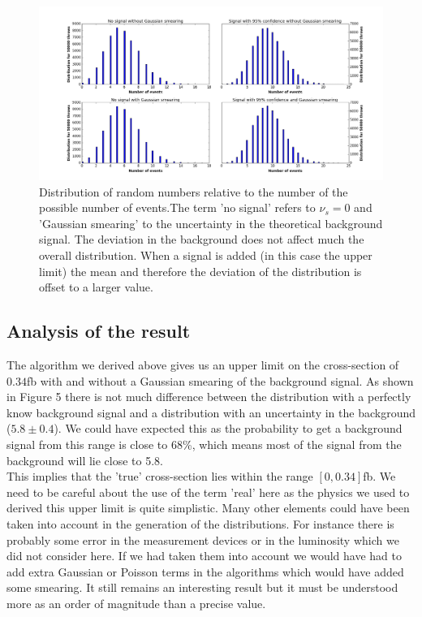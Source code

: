 \documentclass[10 pt]{article}
\numberwithin{equation}{section}
\begin{document}
\begin{figure}[H]
\includegraphics[width=\linewidth]{poisson}
\caption{Distribution of random numbers relative to the number of the possible number of events.The term 'no signal' refers to $\nu_s = 0$ and 'Gaussian smearing' to the uncertainty in the theoretical background signal. The deviation in the background does not affect much the overall distribution. When a signal is added (in this case the upper limit) the mean and therefore the deviation of the distribution is offset to a larger value.}
\end{figure}

\begin{multicols}{2}

\subsection{Analysis of the result}

The algorithm we derived above gives us an upper limit on the cross-section of $0.34$fb with and without a Gaussian smearing of the background signal. As shown in Figure 5 there is not much difference between the distribution with a perfectly know background signal and a distribution with an uncertainty in the background ($5.8 \pm 0.4$). We could have expected this as the probability to get a background signal from this range is close to 68\%, which means most of the signal from the background will lie close to 5.8.\\
This implies that the 'true' cross-section lies within the range $[0,0.34]$fb. We need to be careful about the use of the term 'real' here as the physics we used to derived this upper limit is quite simplistic. Many other elements could have been taken into account in the generation of the distributions. For instance there is probably some error in the measurement devices or in the luminosity which we did not consider here. If we had taken them into account we would have had to add extra Gaussian or Poisson terms in the algorithms which would have added some smearing. It still remains an interesting result but it must be understood more as an order of magnitude than a precise value.


\end{multicols}
\end{document}
